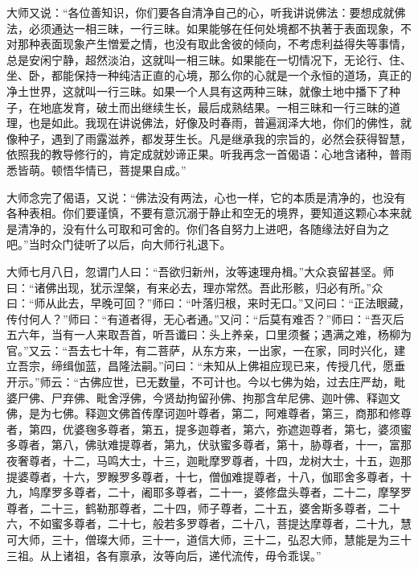 \documentclass[12pt,twoside,openany]{book}
\begin{document}
{大师又说：“各位善知识，你们要各自清净自己的心，听我讲说佛法：要想成就佛法，必须通达一相三昧，一行三昧。如果能够在任何处境都不执著于表面现象，不对那种表面现象产生憎爱之情，也没有取此舍彼的倾向，不考虑利益得失等事情，总是安闲宁静，超然淡泊，这就叫一相三昧。如果能在一切情况下，无论行、住、坐、卧，都能保持一种纯洁正直的心境，那么你的心就是一个永恒的道场，真正的净土世界，这就叫一行三昧。如果一个人具有这两种三昧，就像土地中播下了种子，在地底发育，破土而出继续生长，最后成熟结果。一相三昧和一行三昧的道理，也是如此。我现在讲说佛法，好像及时春雨，普遍润泽大地，你们的佛性，就像种子，遇到了雨露滋养，都发芽生长。凡是继承我的宗旨的，必然会获得智慧，依照我的教导修行的，肯定成就妙谛正果。听我再念一首偈语：心地含诸种，普雨悉皆萌。顿悟华情已，菩提果自成。”

大师念完了偈语，又说：“佛法没有两法，心也一样，它的本质是清净的，也没有各种表相。你们要谨慎，不要有意沉溺于静止和空无的境界，要知道这颗心本来就是清净的，没有什么可取和可舍的。你们各自努力上进吧，各随缘法好自为之吧。”当时众门徒听了以后，向大师行礼退下。}

大师七月八日，忽谓门人曰：“吾欲归新州，汝等速理舟楫。”大众哀留甚坚。师曰：“诸佛出现，犹示涅槃，有来必去，理亦常然。吾此形骸，归必有所。”众曰：“师从此去，早晚可回？”师曰：“叶落归根，来时无口。”又问曰：“正法眼藏，传付何人？”师曰：“有道者得，无心者通。”又问：“后莫有难否？”师曰：“吾灭后五六年，当有一人来取吾首，听吾谶曰：头上养亲，口里须餐；遇满之难，杨柳为官。”又云：“吾去七十年，有二菩萨，从东方来，一出家，一在家，同时兴化，建立吾宗，缔缉伽蓝，昌隆法嗣。”问曰：“未知从上佛祖应现已来，传授几代，愿垂开示。”师云：“古佛应世，已无数量，不可计也。今以七佛为始，过去庄严劫，毗婆尸佛、尸弃佛、毗舍浮佛，今贤劫拘留孙佛、拘那含牟尼佛、迦叶佛、释迦文佛，是为七佛。释迦文佛首传摩诃迦叶尊者，第二，阿难尊者，第三，商那和修尊者，第四，优婆毱多尊者，第五，提多迦尊者，第六，弥遮迦尊者，第七，婆须蜜多尊者，第八，佛驮难提尊者，第九，伏驮蜜多尊者，第十，胁尊者，十一，富那夜奢尊者，十二，马鸣大士，十三，迦毗摩罗尊者，十四，龙树大士，十五，迦那提婆尊者，十六，罗睺罗多尊者，十七，僧伽难提尊者，十八，伽耶舍多尊者，十九，鸠摩罗多尊者，二十，阇耶多尊者，二十一，婆修盘头尊者，二十二，摩孥罗尊者，二十三，鹤勒那尊者，二十四，师子尊者，二十五，婆舍斯多尊者，二十六，不如蜜多尊者，二十七，般若多罗尊者，二十八，菩提达摩尊者，二十九，慧可大师，三十，僧璨大师，三十一，道信大师，三十二，弘忍大师，慧能是为三十三祖。从上诸祖，各有禀承，汝等向后，递代流传，毋令乖误。”
\end{document}
